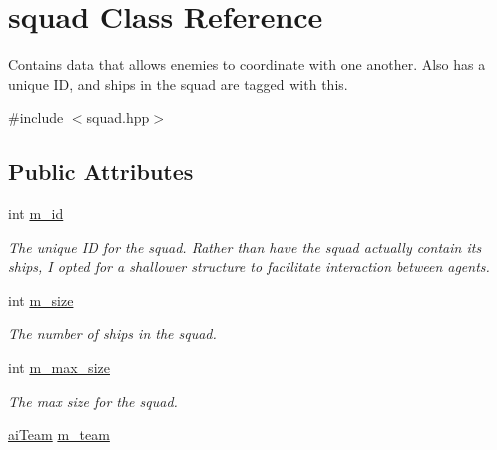 \hypertarget{structsquad}{\section{squad Class Reference}
\label{structsquad}
}


Contains data that allows enemies to coordinate with one another. Also has a unique I\-D, and ships in the squad are tagged with this.  




{\ttfamily \#include $<$squad.\-hpp$>$}

\subsection*{Public Attributes}
\begin{DoxyCompactItemize}
\item 
\hypertarget{structsquad_a7462a498cd5e759746adc25e312156c4}{int \hyperlink{structsquad_a7462a498cd5e759746adc25e312156c4}{m\-\_\-id}}\label{structsquad_a7462a498cd5e759746adc25e312156c4}

\begin{DoxyCompactList}\small\item\em The unique I\-D for the squad. Rather than have the squad actually contain its ships, I opted for a shallower structure to facilitate interaction between agents. \end{DoxyCompactList}\item 
\hypertarget{structsquad_a480945019f91f6cd4e71c9a632f4090a}{int \hyperlink{structsquad_a480945019f91f6cd4e71c9a632f4090a}{m\-\_\-size}}\label{structsquad_a480945019f91f6cd4e71c9a632f4090a}

\begin{DoxyCompactList}\small\item\em The number of ships in the squad. \end{DoxyCompactList}\item 
\hypertarget{structsquad_a470eb2e3b7123f5b565f36bf24e8c41d}{int \hyperlink{structsquad_a470eb2e3b7123f5b565f36bf24e8c41d}{m\-\_\-max\-\_\-size}}\label{structsquad_a470eb2e3b7123f5b565f36bf24e8c41d}

\begin{DoxyCompactList}\small\item\em The max size for the squad. \end{DoxyCompactList}\item 
\hypertarget{structsquad_a6c73412eccda20dac696566e6e6716a8}{\hyperlink{enemy_8hpp_abac1fdbabb5a6be5f0d6ae40be5c5a58}{ai\-Team} \hyperlink{structsquad_a6c73412eccda20dac696566e6e6716a8}{m\-\_\-team}}\label{structsquad_a6c73412eccda20dac696566e6e6716a8}


\end{DoxyCompactItemize}
